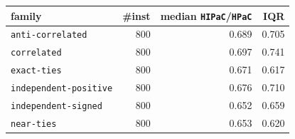 \begin{tabular}{@{}lrrr@{}}
\toprule
family & \#inst & median \texttt{HIPaC}/\texttt{HPaC} & IQR \\
\midrule
\texttt{anti-correlated} & 800 & 0.689 & 0.705 \\
\texttt{correlated} & 800 & 0.697 & 0.741 \\
\texttt{exact-ties} & 800 & 0.671 & 0.617 \\
\texttt{independent-positive} & 800 & 0.676 & 0.710 \\
\texttt{independent-signed} & 800 & 0.652 & 0.659 \\
\texttt{near-ties} & 800 & 0.653 & 0.620 \\
\bottomrule
\end{tabular}
